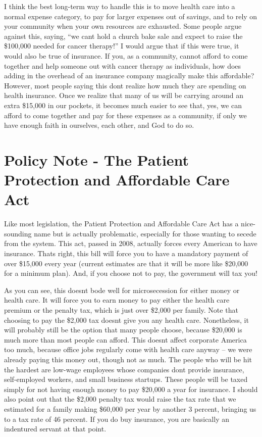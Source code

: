 I think the best long-term way to handle this is to move health care
into a normal expense category, to pay for larger expenses out of
savings, and to rely on your community when your own resources are
exhausted.  Some people argue against this, saying, “we
can{\textquotesingle}t hold a church bake sale and expect to raise the
\$100,000 needed for cancer therapy!”  I would argue that if this were
true, it would also be true of insurance.  If you, as a community,
cannot afford to come together and help someone out with cancer therapy
as individuals, how does adding in the overhead of an insurance company
magically make this affordable?  However, most people saying this
don{\textquotesingle}t realize how much they are spending on health
insurance.  Once we realize that many of us will be carrying around an
extra \$15,000 in our pockets, it becomes much easier to see that, yes,
we can afford to come together and pay for these expenses as a
community, if only we have enough faith in ourselves, each other, and
God to do so.

\section{Policy Note - The Patient Protection and Affordable Care Act}

Like most legislation, the Patient Protection and Affordable Care Act
has a nice-sounding name but is
actually problematic,
especially for those wanting to secede from the system. This act,
passed in 2008, actually forces every American to have insurance.
That{\textquotesingle}s right, this bill will force you to have a
mandatory payment of over \$15,000 every year (current estimates are
that it will be more like \$20,000 for a minimum plan). And, if you
choose not to pay, the government will tax you!  

As you can see, this doesn{\textquotesingle}t bode well for
microsecession for either money or health care. It will force you to
earn money to pay either the health care premium or the penalty tax,
which is just over \$2,000 per family. Note that choosing to pay the
\$2,000 tax doesn{\textquotesingle}t give you any health care. 
Nonetheless, it will probably still be the option that many people
choose, because \$20,000 is much more than most people can afford. 
This doesn{\textquotesingle}t affect corporate America too much,
because office jobs regularly come with health care anyway – we were
already paying this money out, though not as much.  The people who will
be hit the hardest are low-wage employees whose companies
don{\textquotesingle}t provide insurance, self-employed workers, and
small business startups.  These people will be taxed simply for not
having enough money to pay \$20,000 a year for insurance.  I should
also point out that the \$2,000 penalty tax would raise the tax rate
that we estimated for a family making \$60,000 per year by another 3
percent, bringing us to a tax rate of 46 percent. If you do buy
insurance, you are basically an indentured servant at that point.

